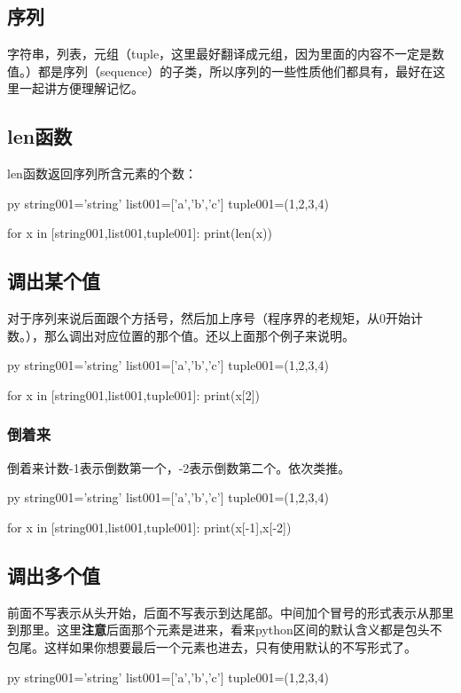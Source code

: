 \documentclass[12pt,oneside]{book}
\begin{document}
\begin{common-format}
\section{序列}
字符串，列表，元组（tuple，这里最好翻译成元组，因为里面的内容不一定是数值。）都是序列（sequence）的子类，所以序列的一些性质他们都具有，最好在这里一起讲方便理解记忆。

\subsection{len函数}
len函数返回序列所含元素的个数：
\begin{xverbatim}[129]{py}
string001='string'
list001=['a','b','c']
tuple001=(1,2,3,4)

for x in [string001,list001,tuple001]:
    print(len(x))
\end{xverbatim}


\subsection{调出某个值}
对于序列来说后面跟个方括号，然后加上序号（程序界的老规矩，从0开始计数。），那么调出对应位置的那个值。还以上面那个例子来说明。
\begin{xverbatim}[129]{py}
string001='string'
list001=['a','b','c']
tuple001=(1,2,3,4)

for x in [string001,list001,tuple001]:
    print(x[2])
\end{xverbatim}

\subsubsection{倒着来}
倒着来计数-1表示倒数第一个，-2表示倒数第二个。依次类推。
\begin{xverbatim}[129]{py}
string001='string'
list001=['a','b','c']
tuple001=(1,2,3,4)

for x in [string001,list001,tuple001]:
    print(x[-1],x[-2])
\end{xverbatim}

\subsection{调出多个值}
\label{sec:调出多个值}
前面不写表示从头开始，后面不写表示到达尾部。中间加个冒号的形式表示从那里到那里。这里\textbf{注意}后面那个元素是进来，看来python区间的默认含义都是包头不包尾。这样如果你想要最后一个元素也进去，只有使用默认的不写形式了。
\begin{xverbatim}[129]{py}
string001='string'
list001=['a','b','c']
tuple001=(1,2,3,4)


\end{xverbatim}
\end{common-format}
\end{document}

